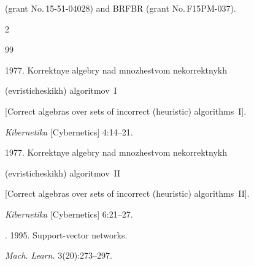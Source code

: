 (grant No.\,15-51-04028) and BRFBR (grant No.\,F15PM-037).
















  \begin{multicols}{2}





\renewcommand{\bibname}{\protect\rmfamily References}







{\small\frenchspacing


 {%




 \begin{thebibliography}{99}







 1977. Korrektnye algebry nad mno\-zhe\-st\-vom nekorrektnykh 


(evristicheskikh) algoritmov~I 


[Correct algebras over sets of incorrect (heuristic) algorithms~I]. 


\textit{Kibernetika} [Cybernetics] 4:14--21.




 1977. Korrektnye algebry nad mno\-zhe\-st\-vom nekorrektnykh 


(evristicheskikh) algoritmov~II 


[Correct algebras over sets of incorrect (heuristic) algorithms~II].


\textit{Kibernetika} [Cybernetics] 6:21--27.




. 1995. Support-vector networks. 


\textit{Mach. Learn.} 3(20):273--297.




\end{thebibliography}}}
\end{multicols}
